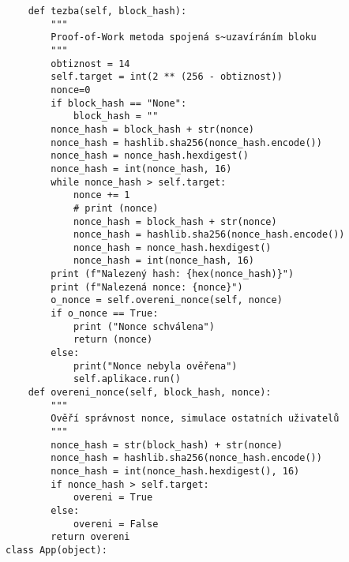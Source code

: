 \documentclass[12pt]{report}			%
\begin{document}
{\begin{appendices}
\begin{lstlisting}
    def tezba(self, block_hash):
        """
        Proof-of-Work metoda spojená s~uzavíráním bloku
        """
        obtiznost = 14
        self.target = int(2 ** (256 - obtiznost)) 
        nonce=0
        if block_hash == "None":
            block_hash = ""
        nonce_hash = block_hash + str(nonce)
        nonce_hash = hashlib.sha256(nonce_hash.encode())
        nonce_hash = nonce_hash.hexdigest()
        nonce_hash = int(nonce_hash, 16)
        while nonce_hash > self.target:
            nonce += 1
            # print (nonce)
            nonce_hash = block_hash + str(nonce)
            nonce_hash = hashlib.sha256(nonce_hash.encode())
            nonce_hash = nonce_hash.hexdigest()
            nonce_hash = int(nonce_hash, 16)           
        print (f"Nalezený hash: {hex(nonce_hash)}")
        print (f"Nalezená nonce: {nonce}")
        o_nonce = self.overeni_nonce(self, nonce)
        if o_nonce == True:
            print ("Nonce schválena")
            return (nonce)
        else:
            print("Nonce nebyla ověřena")
            self.aplikace.run()
    def overeni_nonce(self, block_hash, nonce):
        """
        Ověří správnost nonce, simulace ostatních uživatelů
        """
        nonce_hash = str(block_hash) + str(nonce)
        nonce_hash = hashlib.sha256(nonce_hash.encode())
        nonce_hash = int(nonce_hash.hexdigest(), 16)
        if nonce_hash > self.target:
            overeni = True
        else:
            overeni = False
        return overeni
class App(object):   


\end{lstlisting}
\end{appendices}}
\end{document}
